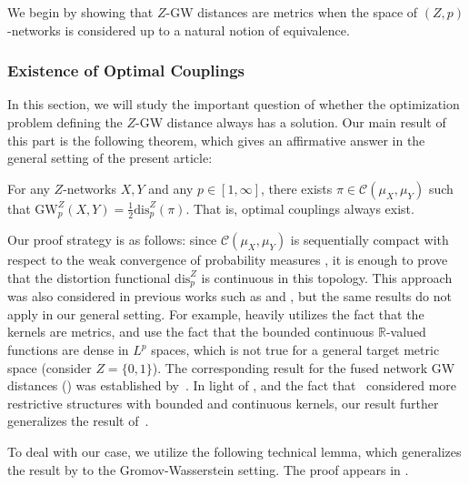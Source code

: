 \documentclass[twoside,11pt]{article}
\theoremstyle{definition}
\newcommand{\dgwz}{\mathrm{GW}_p^Z}
\newcommand{\disp}{\mathrm{dis}_p}
\begin{document}
We begin by showing that $Z$-GW distances are metrics when the space of $(Z,p)$-networks is considered up to a natural notion of equivalence.

\subsubsection{Existence of Optimal Couplings}
In this section, we will study the important question of whether the optimization problem defining the $Z$-GW distance always has a solution. Our main result of this part is the following theorem, which gives an affirmative answer in the general setting of the present article:
\begin{theorem}
    \label{thm: optimal coupling}
    For any $Z$-networks $X,Y $ and any $p \in [1,\infty]$, there exists $\pi \in \mathcal{C}(\mu_X,\mu_Y)$ such that $\dgwz(X,Y) = \frac{1}{2}\mathrm{dis}_p^Z(\pi)$. That is, optimal couplings always exist.
\end{theorem}
Our proof strategy is as follows: since $\mathcal{C}(\mu_X,\mu_Y)$ is sequentially compact with respect to the weak convergence of probability measures \citep[p. 32]{villani2003topics}, it is enough to prove that the distortion functional $\disp^Z$ is continuous in this topology. This approach was also considered in previous works such as \citet{chowdhury2019gromov} and \citet{memoli2011}, but the same results do not apply in our general setting. For example, \citet{memoli2011} heavily utilizes the fact that the kernels are metrics, and \citet{chowdhury2019gromov} use the fact that the bounded continuous $\mathbb{R}$-valued functions are dense in $L^p$ spaces, which is not true for a general target metric space (consider $Z=\{0,1\}$).  The corresponding result for the fused network GW distances () was established by~\citet{yang2023exploiting}. In light of , and the fact that~\citet{yang2023exploiting} considered more restrictive structures with bounded and continuous kernels, our result further generalizes the result of~\citet[Theorem 2.4]{yang2023exploiting}.

To deal with our case, we utilize the following technical lemma, which generalizes the result by \citet[Lemma 1.8]{santambrogio2015optimal} to the Gromov-Wasserstein setting. The proof appears in .
\end{document}
